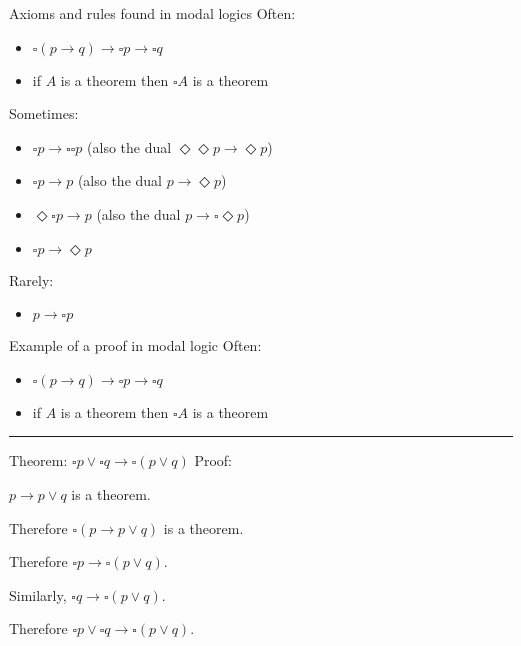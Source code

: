 \documentclass{beamer}
\newcommand{\nec}{\square}
\newcommand{\poss}{\Diamond}
\begin{document}
\begin{frame}{Axioms and rules found in modal logics}
Often:
\begin{itemize}
\item $\nec (p\to q) \to \nec p \to \nec q$
\item if $A$ is a theorem then $\nec A$ is a theorem
\end{itemize}
Sometimes:
\begin{itemize}
\item $\nec p \to \nec\nec p$ (also the dual $\poss\poss p \to \poss p$)
\item $\nec p \to p$ (also the dual $p\to\poss p$)
\item $\poss\nec p \to p$ (also the dual $p\to\nec\poss p$)
\item $\nec p \to \poss p$
\end{itemize}
Rarely:
\begin{itemize}
\item $p\to\nec p$
\end{itemize}
\end{frame}

\begin{frame}{Example of a proof in modal logic}
Often:
\begin{itemize}
\item $\nec (p\to q) \to \nec p \to \nec q$
\item if $A$ is a theorem then $\nec A$ is a theorem
\end{itemize}

\vfill
\hrule
\vfill

Theorem: $\nec p\lor \nec q \to \nec (p\lor q)$
\vfill
Proof:

$p\to p\lor q$ is a theorem.

Therefore $\nec (p\to p\lor q)$ is a theorem.

Therefore $\nec p\to \nec(p\lor q)$.

Similarly, $\nec q\to \nec(p\lor q)$.

Therefore $\nec p\lor\nec q\to\nec(p\lor q)$.
\vfill
\end{frame}
\end{document}
